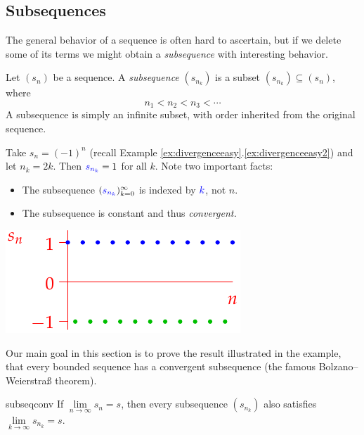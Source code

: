 \clearpage


\subsection{Subsequences}\label{sec:subseq}

The general behavior of a sequence is often hard to ascertain, but if we delete some of its terms we might obtain a \emph{subsequence} with interesting behavior.

\begin{defn}{}{}
	Let $(s_n)$ be a sequence. A \emph{subsequence} $(s_{n_k})$ is a subset $(s_{n_k})\subseteq (s_n)$, where 
	\[n_1<n_2<n_3<\cdots\]
	A subsequence is simply an infinite subset, with order inherited from the original sequence.
\end{defn}

\begin{example}[lower separated=false, sidebyside, sidebyside align=top seam, sidebyside gap=0pt, righthand width=0.38\linewidth]{}{}
	Take $s_n=(-1)^n$ (recall Example \ref*{ex:divergenceeasy}.\ref{ex:divergenceeasy2}) and let $n_k=2k$. Then $\textcolor{blue}{s_{n_k}}=1$ for all $k$. Note two important facts:
	\begin{itemize}
	  \item The subsequence $(\textcolor{blue}{s_{n_k}})_{k=0}^\infty$ is indexed by $\textcolor{blue}{k}$, not $n$.
	  \item The subsequence is constant and thus \emph{convergent.}
	\end{itemize} 
	\tcblower
	\hfill\includegraphics{divergent3}
\end{example}

Our main goal in this section is to prove the result illustrated in the example, that every bounded sequence has a convergent subsequence (the famous Bolzano--Weierstraß theorem).


\begin{lemm}{}{subseqconv}
	If $\lim\limits_{n\to\infty} s_n=s$, then every subsequence $(s_{n_k})$ also satisfies $\lim\limits_{k\to\infty} s_{n_k}=s$.\vspace{-3pt}
\end{lemm}

